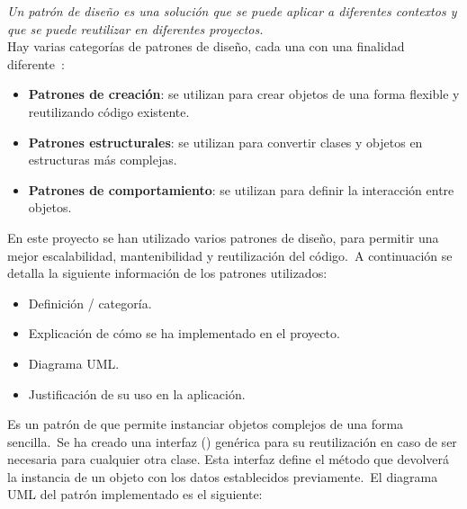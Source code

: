 
\textit{Un patrón de diseño es una solución que se puede aplicar a diferentes contextos y que se
puede reutilizar en diferentes proyectos.} \\
Hay varias categorías de patrones de diseño, cada una con una finalidad diferente~\cite{designPatternClassification}:
\begin{itemize}
	\item \textbf{Patrones de creación}: se utilizan para crear objetos de una forma flexible y reutilizando código
	existente.
	\item \textbf{Patrones estructurales}: se utilizan para convertir clases y objetos en estructuras más complejas.
	\item \textbf{Patrones de comportamiento}: se utilizan para definir la interacción entre objetos.
\end{itemize}
\label{itm:categorías-patrones}

En este proyecto se han utilizado varios patrones de diseño, para permitir una mejor escalabilidad, mantenibilidad y
reutilización del código.\ A continuación se detalla la siguiente información de los patrones utilizados:
\begin{itemize}
	\item Definición / categoría.
	\item Explicación de cómo se ha implementado en el proyecto.
	\item Diagrama UML\@.
	\item Justificación de su uso en la aplicación.
\end{itemize}
\label{itm:uso-patrones}

Es un patrón de  que permite instanciar objetos complejos de una forma sencilla.\ Se ha creado una
interfaz () genérica para su reutilización en caso de ser necesaria para cualquier otra clase.
Esta interfaz define el método  que devolverá la instancia de un objeto con los datos establecidos
previamente.\ El diagrama UML del patrón implementado es el siguiente:

